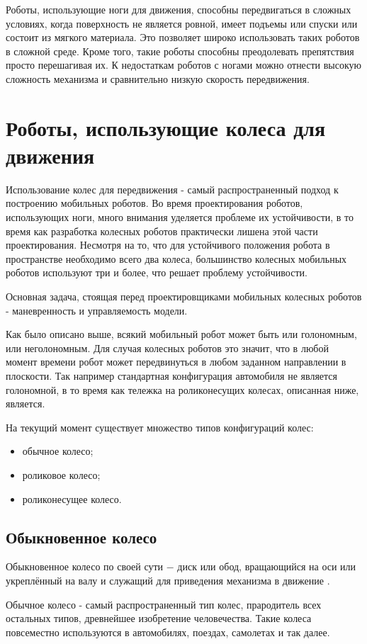 \documentclass[oneside,final,14pt]{extreport}
\newcommand{\indentSpace}{1.25cm}
\begin{document}
Роботы, использующие ноги для движения, способны передвигаться в сложных условиях, когда поверхность не является ровной, имеет подъемы или спуски или состоит из мягкого материала. Это позволяет широко использовать таких роботов в сложной среде. Кроме того, такие роботы способны преодолевать препятствия просто перешагивая их. К недостаткам роботов с ногами можно отнести высокую сложность механизма и сравнительно низкую скорость передвижения.

\section{Роботы, использующие колеса для движения}
Использование колес для передвижения - самый распространенный подход к построению мобильных роботов. Во время проектирования роботов, использующих ноги, много внимания уделяется проблеме их устойчивости, в то время как разработка колесных роботов практически лишена этой части проектирования. Несмотря на то, что для устойчивого положения робота в пространстве необходимо всего два колеса, большинство колесных мобильных роботов используют три и более, что решает проблему устойчивости.

Основная задача, стоящая перед проектировщиками мобильных колесных роботов - маневренность и управляемость модели.

Как было описано выше, всякий мобильный робот может быть или голономным, или неголономным. Для случая колесных роботов это значит, что в любой момент времени робот может передвинуться в любом заданном направлении в плоскости. Так например стандартная конфигурация автомобиля не является голономной, в то время как тележка на роликонесущих колесах, описанная ниже, является.

На текущий момент существует множество типов конфигураций колес:
\begin{itemize}
\item обычное колесо;
\setlength{\itemindent}{-\indentSpace }
\item роликовое колесо;
\item роликонесущее колесо.
\end{itemize}
\subsection{Обыкновенное колесо}
Обыкновенное колесо по своей сути $-$ диск или обод, вращающийся на оси или укреплённый на валу и служащий для приведения механизма в движение \cite{Ozhigov}.

Обычное колесо - самый распространенный тип колес, прародитель всех остальных типов, древнейшее изобретение человечества. Такие колеса повсеместно используются в автомобилях, поездах, самолетах и так далее. 
\end{document}
